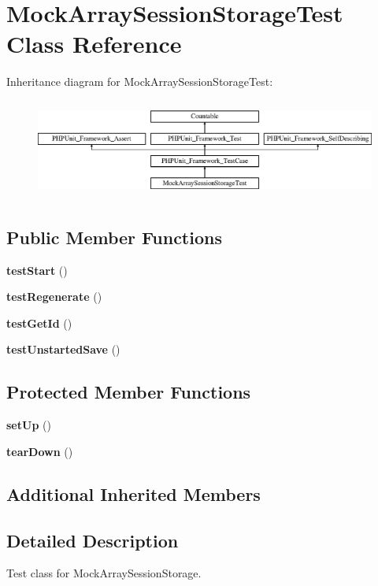 \section{Mock\+Array\+Session\+Storage\+Test Class Reference}
\label{class_symfony_1_1_component_1_1_http_foundation_1_1_tests_1_1_session_1_1_storage_1_1_mock_array_session_storage_test}
Inheritance diagram for Mock\+Array\+Session\+Storage\+Test\+:\begin{figure}[H]
\begin{center}
\leavevmode
\includegraphics[height=3.303835cm]{class_symfony_1_1_component_1_1_http_foundation_1_1_tests_1_1_session_1_1_storage_1_1_mock_array_session_storage_test}
\end{center}
\end{figure}
\subsection*{Public Member Functions}
\begin{DoxyCompactItemize}
\item 
{\bf test\+Start} ()
\item 
{\bf test\+Regenerate} ()
\item 
{\bf test\+Get\+Id} ()
\item 
{\bf test\+Unstarted\+Save} ()
\end{DoxyCompactItemize}
\subsection*{Protected Member Functions}
\begin{DoxyCompactItemize}
\item 
{\bf set\+Up} ()
\item 
{\bf tear\+Down} ()
\end{DoxyCompactItemize}
\subsection*{Additional Inherited Members}


\subsection{Detailed Description}
Test class for Mock\+Array\+Session\+Storage.

